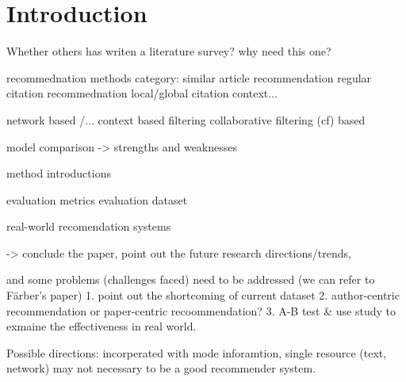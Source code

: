 \section{Introduction}

Whether others has writen a literature survey? why need this one?


recommednation methods category:
    similar article recommendation
    regular citation recommednation
    local/global citation context...

\item

    network based /...
    context based filtering
    collaborative filtering (cf) based


model comparison -> strengths and weaknesses

method introductions

evaluation metrics
evaluation dataset

real-world recomendation systems

-> conclude the paper, point out the future research directions/trends,

and some problems (challenges faced) need to be addressed (we can refer to Färber's paper)
    1. point out the shortcoming of current dataset
    2. author-centric recommendation or paper-centric recoommendation?
    3. A-B test \& use study to exmaine the effectiveness in real world.

Possible directions:
    incorperated with mode inforamtion, single resource (text, network) may not necessary to be a good recommender system.



